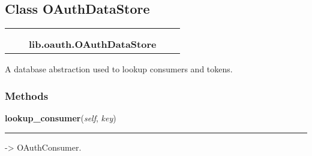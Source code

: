 

\subsection{Class OAuthDataStore}

    \label{lib:oauth:OAuthDataStore}
\begin{tabular}{cccccc}
\multicolumn{2}{r}{\settowidth{\BCL}{object}\multirow{2}{\BCL}{object}}
&&
  \\\cline{3-3}
  &&\multicolumn{1}{c|}{}
&&
  \\
&&\multicolumn{2}{l}{\textbf{lib.oauth.OAuthDataStore}}
\end{tabular}

A database abstraction used to lookup consumers and tokens.



  \subsubsection{Methods}

    \label{lib:oauth:OAuthDataStore:lookup_consumer}

    \vspace{0.5ex}

\hspace{.8\funcindent}\begin{boxedminipage}{\funcwidth}

    \raggedright \textbf{lookup\_consumer}(\textit{self}, \textit{key})

    \vspace{-1.5ex}

    \rule{\textwidth}{0.5\fboxrule}
\setlength{\parskip}{2ex}
    -{\textgreater} OAuthConsumer.

\setlength{\parskip}{1ex}
    \end{boxedminipage}

